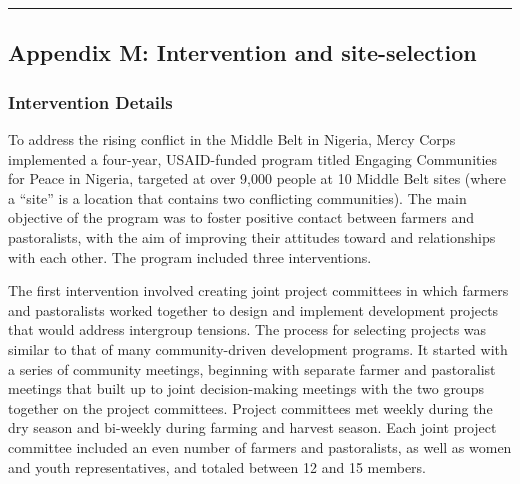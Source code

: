 \documentclass[
]{article}
\begin{document}
\begin{center}\rule{0.5\linewidth}{0.5pt}\end{center}

\hypertarget{appendix-m-intervention-and-site-selection}{%
\subsection{Appendix M: Intervention and
site-selection}\label{appendix-m-intervention-and-site-selection}}

\hypertarget{intervention-details}{%
\subsubsection{Intervention Details}\label{intervention-details}}

To address the rising conflict in the Middle Belt in Nigeria, Mercy
Corps implemented a four-year, USAID-funded program titled Engaging
Communities for Peace in Nigeria, targeted at over 9,000 people at 10
Middle Belt sites (where a ``site'' is a location that contains two
conflicting communities). The main objective of the program was to
foster positive contact between farmers and pastoralists, with the aim
of improving their attitudes toward and relationships with each other.
The program included three interventions.

The first intervention involved creating joint project committees in
which farmers and pastoralists worked together to design and implement
development projects that would address intergroup tensions. The process
for selecting projects was similar to that of many community-driven
development programs. It started with a series of community meetings,
beginning with separate farmer and pastoralist meetings that built up to
joint decision-making meetings with the two groups together on the
project committees. Project committees met weekly during the dry season
and bi-weekly during farming and harvest season. Each joint project
committee included an even number of farmers and pastoralists, as well
as women and youth representatives, and totaled between 12 and 15
members.
\end{document}
